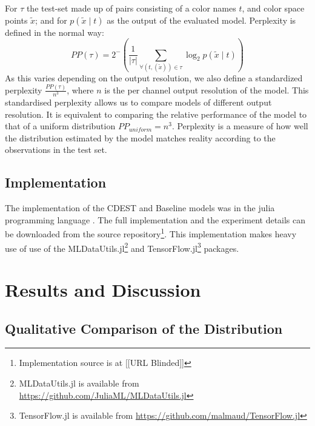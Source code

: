 \documentclass[11pt,a4paper]{article}
\newcommand{\parencite}{\citep}
\begin{document}
For $\tau$ the test-set made up of pairs consisting of a color names $t$, and color space points $\tilde{x}$;
and for $p(\tilde{x}\mid t)$ as the output of the evaluated model.
Perplexity is defined in the normal way:
\[
 PP(\tau) = 2^-{\left(
 	\frac{1}{|\tau|} 
 	\sum_{
	 		\forall(t,(\tilde{x})) \in \tau}
 	 \log_2 p(\tilde{x}\mid t)\right)}
\]
As this varies depending on the output resolution,
we also define a standardized perplexity $\frac{PP(\tau)}{n^3}$, where $n$ is the per channel output resolution of the model.
This standardised perplexity allows us to compare models of different output resolution.
It is equivalent to comparing the relative performance of the model to that of a uniform distribution $PP_{uniform}=n^3$.
Perplexity is a measure of how well the distribution estimated by the model matches reality according to the observations in the test set.

\subsection{Implementation}
The implementation of the CDEST and Baseline models was in the julia programming language \parencite{Julia}.
The full implementation and the experiment details can be downloaded from the source repository\footnote{Implementation source is at %
[[URL Blinded]]}.
This implementation makes heavy use of use of the MLDataUtils.jl\footnote{MLDataUtils.jl is available from \url{https://github.com/JuliaML/MLDataUtils.jl}} and TensorFlow.jl\footnote{TensorFlow.jl is available from \url{https://github.com/malmaud/TensorFlow.jl}} packages.


\section{Results and Discussion}\label{sec:results-and-discussion}
\subsection{Qualitative Comparison of the Distribution}\label{resultsdistributions}

\newcommand{\multimodalfig}[2]{
	\begin{figure}
		\texttt{[image: multimodal/empiri256\#1]}
		
		\vspace{3mm}
		
		\texttt{[image: multimodal/gru256\#1]}	
		\caption{\label{fig#1} Distribution estimate for \mbox{\texttt{``#2''}}}
	\end{figure}
}
\end{document}
